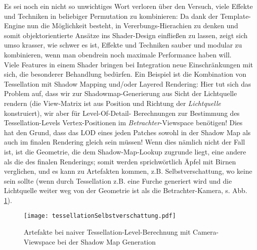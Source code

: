 	Es sei noch ein nicht so unwichtiges Wort verloren über den Versuch, viele Effekte und Techniken in beliebiger
	Permutation zu kombinieren: Da dank der Template-Engine nun die Möglichkeit besteht, in Vererbungs-Hierachien zu denken
	und somit objektorientierte Ansätze ins Shader-Design einfließen zu lassen, zeigt sich umso krasser,
	wie schwer es ist, Effekte und Techniken sauber und modular zu kombinieren, wenn man obendrein noch maximale
	Performance haben will.\\
	Viele Features in einem Shader bringen bei Integration neue Einschränkungen mit sich, 
	die besonderer Behandlung bedürfen.
	Ein Beispiel ist die Kombination von Tessellation mit Shadow Mapping und/oder Layered Rendering: 
	Hier tut sich das Problem auf, dass wir zur Shadowmap-Generierung aus Sicht der Lichtquelle rendern 
	(die View-Matrix ist aus Position und Richtung der \emph{Lichtquelle} konstruiert), wir aber für Level-Of-Detail-	
	Berechnungen zur Bestimmung des Tessellation-Levels	Vertex-Positionen im \emph{Betrachter}-Viewspace benötigen!
	Dies hat den Grund, dass das LOD eines jeden Patches sowohl in der Shadow Map als auch im finalen Rendering
	gleich sein müssen! Wenn dies nämlich nicht der Fall ist, ist die Geometrie, die dem Shadow-Map-Lookup
	zugrunde liegt, eine andere als die des finalen Renderings; somit werden sprichwörtlich Äpfel mit Birnen verglichen,
	und es kann zu Artefakten kommen, z.B. Selbstverschattung, wo keine sein sollte (wenn durch Tessellation z.B.
	eine Furche generiert wird und die Lichtquelle weiter weg von der Geometrie ist als die Betrachter-Kamera, 
	s. Abb. \ref{fig:tessellationSelbstverschattung}).
	
	\begin{figure}[!h]
	\texttt{[image: tessellationSelbstverschattung.pdf]}
	\caption{Artefakte bei naiver Tessellation-Level-Berechnung mit Camera-Viewspace bei der Shadow Map Generation}
	\label{fig:tessellationSelbstverschattung}
	\end{figure}
	
